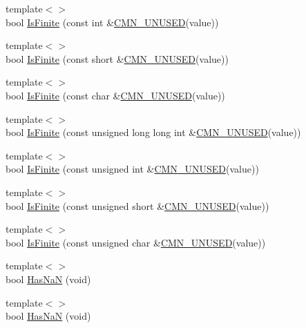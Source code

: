 \begin{DoxyCompactItemize}
\item 
{\footnotesize template$<$$>$ }\\bool \hyperlink{classcmn_type_traits_a4cbe90ed161de4147f49c29ec9d77fc8}{Is\+Finite} (const int \&\hyperlink{cmn_portability_8h_a021894e2626935fa2305434b1e893ff6}{C\+M\+N\+\_\+\+U\+N\+U\+S\+E\+D}(value))
\item 
{\footnotesize template$<$$>$ }\\bool \hyperlink{classcmn_type_traits_ac02e81d646ff4f4d98b72438c341ac2b}{Is\+Finite} (const short \&\hyperlink{cmn_portability_8h_a021894e2626935fa2305434b1e893ff6}{C\+M\+N\+\_\+\+U\+N\+U\+S\+E\+D}(value))
\item 
{\footnotesize template$<$$>$ }\\bool \hyperlink{classcmn_type_traits_ab4ef656affee9ec3bd76f0ba1dbaa782}{Is\+Finite} (const char \&\hyperlink{cmn_portability_8h_a021894e2626935fa2305434b1e893ff6}{C\+M\+N\+\_\+\+U\+N\+U\+S\+E\+D}(value))
\item 
{\footnotesize template$<$$>$ }\\bool \hyperlink{classcmn_type_traits_a36bead96d0a39112e7a69289600d13a8}{Is\+Finite} (const unsigned long long int \&\hyperlink{cmn_portability_8h_a021894e2626935fa2305434b1e893ff6}{C\+M\+N\+\_\+\+U\+N\+U\+S\+E\+D}(value))
\item 
{\footnotesize template$<$$>$ }\\bool \hyperlink{classcmn_type_traits_abc292d87bce717a48bc0e71bd063ccf6}{Is\+Finite} (const unsigned int \&\hyperlink{cmn_portability_8h_a021894e2626935fa2305434b1e893ff6}{C\+M\+N\+\_\+\+U\+N\+U\+S\+E\+D}(value))
\item 
{\footnotesize template$<$$>$ }\\bool \hyperlink{classcmn_type_traits_ae8cf98b7a2625a9e43eadf1dac12025e}{Is\+Finite} (const unsigned short \&\hyperlink{cmn_portability_8h_a021894e2626935fa2305434b1e893ff6}{C\+M\+N\+\_\+\+U\+N\+U\+S\+E\+D}(value))
\item 
{\footnotesize template$<$$>$ }\\bool \hyperlink{classcmn_type_traits_a27110c3f8bff3fd0de5f86f298888980}{Is\+Finite} (const unsigned char \&\hyperlink{cmn_portability_8h_a021894e2626935fa2305434b1e893ff6}{C\+M\+N\+\_\+\+U\+N\+U\+S\+E\+D}(value))
\item 
{\footnotesize template$<$$>$ }\\bool \hyperlink{classcmn_type_traits_a7531ba0e219c702284d3e0d8c5945fbb}{Has\+Na\+N} (void)
\item 
{\footnotesize template$<$$>$ }\\bool \hyperlink{classcmn_type_traits_a6ebf01b97b54732efbc870532a71b516}{Has\+Na\+N} (void)

\end{DoxyCompactItemize}
